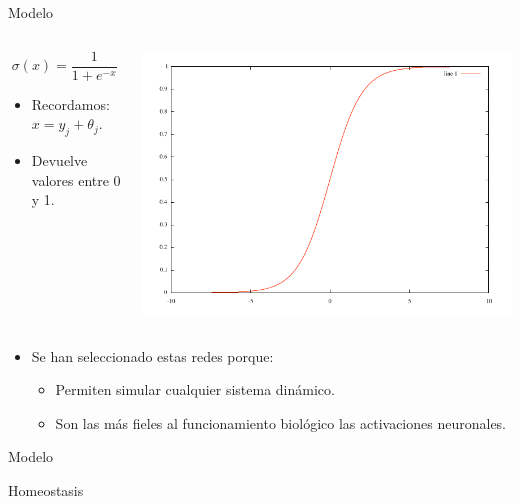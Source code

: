 \documentclass[aspectratio=169]{beamer}
\begin{document}
\begin{frame}{Modelo}
  \begin{columns}
    \begin{column}{0.47\textwidth}
      \begin{equation*}
        \sigma (x)=\frac{1}{1+e^{-x}}
      \end{equation*}
        \begin{itemize}
          \item Recordamos: $x = y_{j} + \theta_{j}$.
          \item Devuelve valores entre 0 y 1.
        \end{itemize}
    \end{column}
    \begin{column}{0.5\textwidth}
      \includegraphics[width=1.0\textwidth,height=.50\textheight]{Imagenes/Sigmoid}
    \end{column}
  \end{columns}
  \begin{itemize}
    \item Se han seleccionado estas redes porque:
    \begin{itemize}
      \item Permiten simular cualquier sistema dinámico.
      \item Son las más fieles al funcionamiento biológico las activaciones neuronales.
    \end{itemize}
  \end{itemize}
\end{frame}

\begin{frame}{Modelo}
\begin{block}{Homeostasis}

\end{block}
\end{frame}
\end{document}
